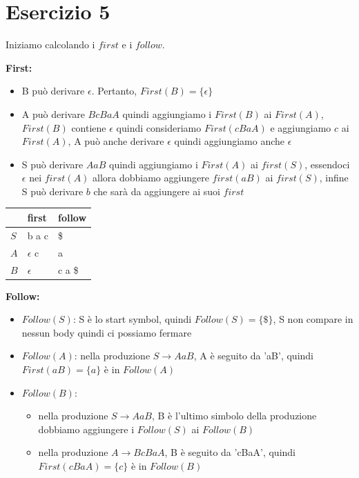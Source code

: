 \documentclass[11pt]{article}
\begin{document}
\section*{Esercizio 5}
Iniziamo calcolando i $first$ e i $follow$.\\
\begin{multicols}{2}
\noindent\textbf{First:}
\begin{itemize}
  \small
  \item B può derivare $\epsilon$. Pertanto, $First(B) = \{\epsilon\}$
  \item A può derivare $BcBaA$ quindi aggiungiamo i $First(B)$ ai $First(A)$, $First(B)$ contiene $\epsilon$
  quindi consideriamo $First(cBaA)$ e aggiungiamo $c$ ai $First(A)$,
  A può anche derivare $\epsilon$ quindi aggiungiamo anche $\epsilon$
  \item S può derivare $AaB$ quindi aggiungiamo i $First(A)$ ai $first(S)$, 
  essendoci $\epsilon$ nei $first(A)$ allora dobbiamo aggiungere $first(aB)$ ai $first(S)$, infine S può derivare $b$ che sarà da aggiungere ai suoi $first$ 
\end{itemize}
\begin{table}[H]  
  \centering
  \begin{tabularx}{\linewidth}{|>{\centering\arraybackslash}X|>{\centering\arraybackslash}X|>{\centering\arraybackslash}X|}
    \hline
    & first & follow  \\
    \hline
    $S$ & b a c & \$ \\
    \hline
    $A$ & $\epsilon$ c & a \\
    \hline
    $B$ & $\epsilon$ & c a \$ \\
    \hline
  \end{tabularx}
  \label{tab:05-first-follow}
\end{table}
\textbf{Follow:} 
\begin{itemize}
  \small
  \item $Follow(S)$: S è lo start symbol, quindi $Follow(S) = \{\$\}$, S non compare in nessun body quindi ci possiamo fermare
  \item $Follow(A)$: nella produzione $S \to AaB$, A è seguito da 'aB', quindi $First(aB) = \{a\}$ è in $Follow(A)$
  \item $Follow(B)$:
  \begin{itemize}
    \item nella produzione $S \to AaB$, B è l'ultimo simbolo della produzione dobbiamo aggiungere i $Follow(S)$ ai $Follow(B)$
    \item nella produzione $A \to BcBaA$, B è seguito da 'cBaA', quindi $First(cBaA) = \{c\}$ è in $Follow(B)$
  \end{itemize} 
\end{itemize}
\end{multicols}
\end{document}
